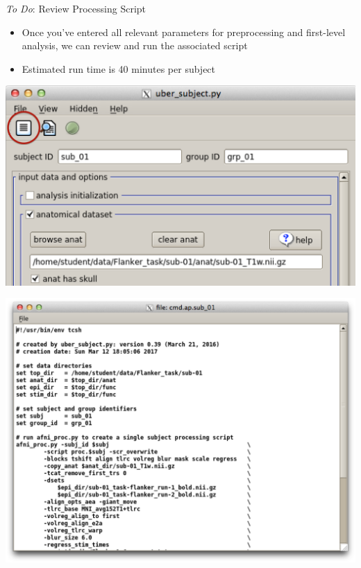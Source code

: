 \documentclass[t,12pt]{beamer}
\begin{document}
\begin{frame}{\emph{To Do}: Review Processing Script}
\vspace{10pt}
\begin{itemize}
\setlength\itemsep{1em}
\item Once you've entered all relevant parameters for preprocessing and first-level analysis, we can review and run the associated script
\item Estimated run time is 40 minutes per subject
\end{itemize}
\vspace{4pt}
\centering
\begin{minipage}{0.40\textwidth}
\includegraphics[width=\textwidth]{images/gen_afni_proc.png}
\end{minipage}
\begin{minipage}{0.55\textwidth}
\includegraphics[width=\textwidth]{images/gen_script.png}
\end{minipage}
\end{frame}
\end{document}
